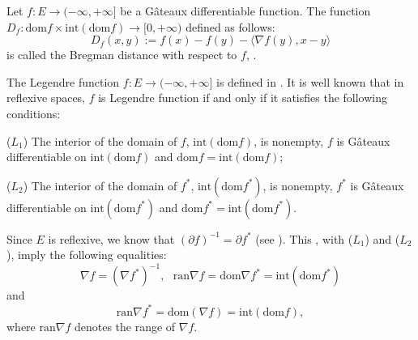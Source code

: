 \documentclass[reqno,b5paper]{amsart}
\theoremstyle{plain}
\theoremstyle{definition}
\numberwithin{equation}{section}
\numberwithin{equation}{section}
\begin{document}
Let $f: E\to (-\infty,+\infty]$ be a G\^{a}teaux differentiable function. The function $D_{f}: \text{dom} f\times \text{int}(\text{dom} f)\to [0,+\infty)$ defined as follows:
\begin{equation}\label{1}
D_{f}(x,y):=f(x)-f(y)-\langle \nabla f(y),x-y\rangle
\end{equation}
is called the Bregman distance with respect to $f$, \cite{cens}.

The Legendre function $f:E\to (-\infty,+\infty]$ is defined in \cite{bau}. It is well known that in reflexive spaces, $f$ is Legendre function if and only if it satisfies the following conditions:

($L_{1}$) The interior of the domain of $f$, $\text{int}(\text{dom} f)$, is nonempty, $f$ is G\^{a}teaux differentiable on $\text{int}(\text{dom} f)$ and $\text{dom} f=\text{int}( \text{dom} f)$;

($L_{2}$) The interior of the domain of $f^{*}$, $\text{int}( \text{dom} f^{*})$, is nonempty, $f^{*}$ is G\^{a}teaux differentiable on $\text{int}(\text {dom} f^{*})$ and $\text{dom} f^{*}= \text{int}( \text{dom} f^{*})$.

\noindent Since $E$ is reflexive, we know that $(\partial f)^{-1}=\partial f^{*}$ (see \cite{bon}). This , with ($L_{1}$) and ($L_{2}$), imply the following equalities: 
$$ \nabla f=(\nabla f^{*})^{-1},  \ \ \ \text{ran} \nabla f=\text{dom} \nabla f^{*}=\text{int}(\text{dom} f^{*})$$
 and $$\text {ran} \nabla f^{*}=\text{dom}(\nabla f)=\text {int}(\text{dom} f),$$ where $\text{ran}\nabla f$ denotes the range of $\nabla f$. 
\end{document}
